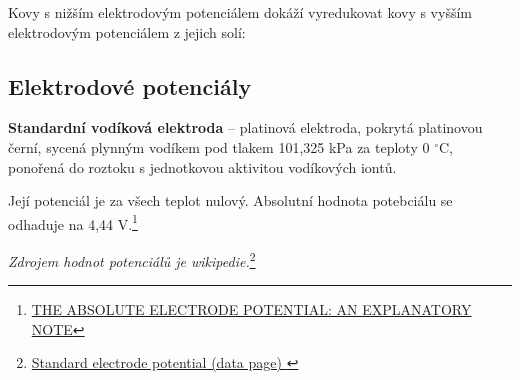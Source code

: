 
Kovy s nižším elektrodovým potenciálem dokáží vyredukovat kovy s vyšším elektrodovým potenciálem z jejich solí:



\subsection{Elektrodové potenciály}

\textbf{Standardní vodíková elektroda} -- platinová elektroda, pokrytá platinovou černí, sycená plynným vodíkem pod tlakem 101,325 kPa za teploty 0 $^\circ$C, ponořená do roztoku s jednotkovou aktivitou vodíkových iontů.


Její potenciál je za všech teplot nulový. Absolutní hodnota potebciálu se odhaduje na 4,44 V.\footnote{\href{https://publications.iupac.org/pac/1986/pdf/5807x0955.pdf}{THE ABSOLUTE ELECTRODE POTENTIAL: AN EXPLANATORY NOTE}}

\textit{Zdrojem hodnot potenciálů je wikipedie.}\footnote{\href{https://en.wikipedia.org/wiki/Standard_electrode_potential_(data_page)}{Standard electrode potential (data page)
}}

